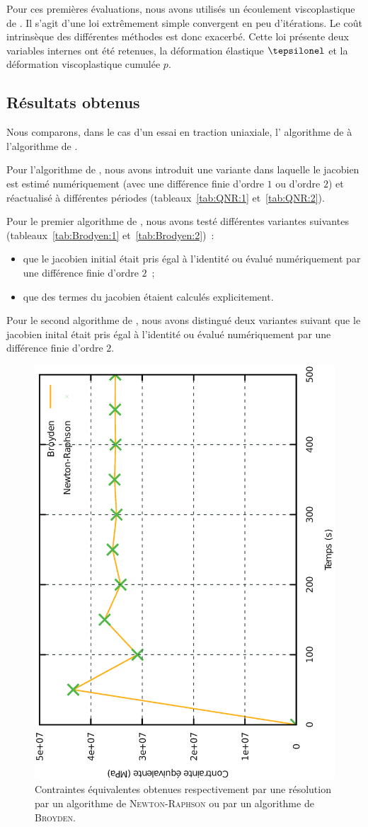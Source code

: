 \documentclass[rectoverso,pleiades,pstricks,leqno,anti]{texmf/note_technique_2010}
\begin{document}
Pour ces premières évaluations, nous avons utilisés un écoulement
viscoplastique de . Il s'agit d'une loi extrêmement simple
convergent en peu d'itérations. Le coût intrinsèque des différentes
méthodes est donc exacerbé. Cette loi présente deux variables internes
ont été retenues, la déformation élastique \(\tepsilonel\) et la
déformation viscoplastique cumulée \(p\).

\subsection{Résultats obtenus}

Nous comparons, dans le cas d'un essai en traction uniaxiale, l'
algorithme de  à l'algorithme de .

Pour l'algorithme de , nous avons introduit une variante
dans laquelle le jacobien est estimé numériquement (avec une différence
finie d'ordre \(1\) ou d'ordre \(2\)) et réactualisé à différentes
périodes (tableaux~\ref{tab:QNR:1} et~\ref{tab:QNR:2}).

Pour le premier algorithme de , nous avons testé
différentes variantes suivantes (tableaux~\ref{tab:Brodyen:1}
et~\ref{tab:Brodyen:2})~:
\begin{itemize}
  \item que le jacobien initial était pris égal à l'identité ou
  évalué numériquement par une différence finie d'ordre \(2\)~;
  \item que des termes du jacobien étaient calculés
  explicitement.
\end{itemize}

Pour le second algorithme de , nous avons distingué
deux variantes suivant que le jacobien inital était pris égal à
l'identité ou évalué numériquement par une différence finie d'ordre
\(2\).

\begin{figure}[htbp]
  \centering
  \includegraphics[height=0.8\linewidth,angle=-90]{Images/CompSeq.eps}
  \caption{Contraintes équivalentes obtenues respectivement par une
    résolution par un algorithme de \textsc{Newton-Raphson} ou par un
    algorithme de \textsc{Broyden}.}
  \label{fig:CompVMis}
\end{figure}
\end{document}
